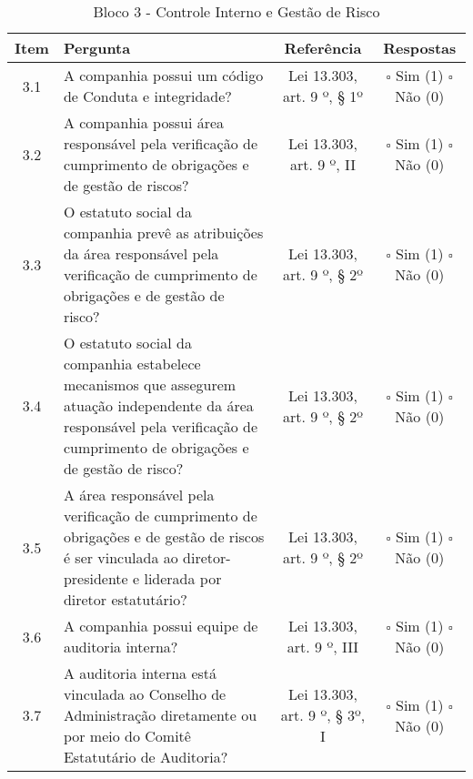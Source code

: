 \begin{center}
\begin{longtable}{c l c c}
\caption{Bloco 3 - Controle Interno e Gestão de Risco} \label{tab:bloco3} \\
\hline
 Item & Pergunta & Referência & Respostas \\ 
 \hline
3.1 &\parbox[t]{8cm}{A companhia possui um código de Conduta e integridade?} & \parbox[t]{2cm}{Lei 13.303, art. 9 º, § 1º} & \parbox[t]{2cm}{$\square$ Sim (1) \\ $\square$ Não (0)}\\

3.2 &\parbox[t]{8cm}{A companhia possui área responsável pela verificação de cumprimento de obrigações e de gestão de riscos?} & \parbox[t]{2cm}{Lei 13.303, art. 9 º, II} & \parbox[t]{2cm}{$\square$ Sim (1) \\ $\square$ Não (0)}\\

3.3 &\parbox[t]{8cm}{O estatuto social da companhia prevê as atribuições da área responsável pela verificação de cumprimento de obrigações e de gestão de risco?} & \parbox[t]{2cm}{Lei 13.303, art. 9 º, § 2º} & \parbox[t]{2cm}{$\square$ Sim (1) \\ $\square$ Não (0)}\\

3.4 &\parbox[t]{8cm}{O estatuto social da companhia estabelece mecanismos que assegurem atuação independente da área responsável pela verificação de cumprimento de obrigações e de gestão de risco?} & \parbox[t]{2cm}{Lei 13.303, art. 9 º, § 2º} & \parbox[t]{2cm}{$\square$ Sim (1) \\ $\square$ Não (0)}\\

3.5 &\parbox[t]{8cm}{A área responsável pela verificação de cumprimento de obrigações e de gestão de riscos é ser vinculada ao diretor-presidente e liderada por diretor estatutário?} & \parbox[t]{2cm}{Lei 13.303, art. 9 º, § 2º} & \parbox[t]{2cm}{$\square$ Sim (1) \\ $\square$ Não (0)}\\

3.6 &\parbox[t]{8cm}{A companhia possui equipe de auditoria interna?} & \parbox[t]{2cm}{Lei 13.303, art. 9 º, III} & \parbox[t]{2cm}{$\square$ Sim (1) \\ $\square$ Não (0)}\\

3.7 &\parbox[t]{8cm}{A auditoria interna está vinculada ao Conselho de Administração diretamente ou por meio do Comitê Estatutário de Auditoria?} & \parbox[t]{2cm}{Lei 13.303, art. 9 º, § 3º, I} & \parbox[t]{2cm}{$\square$ Sim (1) \\ $\square$ Não (0)}\\


\end{longtable}
\end{center}

